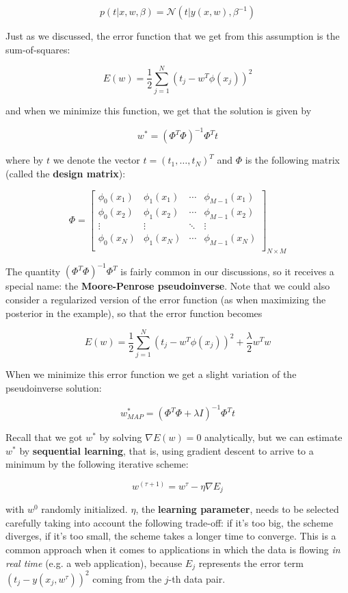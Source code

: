 \[p(t|x,w,\beta) = \mathcal{N}(t|y(x,w),\beta^{-1})\]

Just as we discussed, the error function that we get from this assumption is the sum-of-squares:

\[E(w) = \frac{1}{2}\sum_{j=1}^N(t_j - w^T\phi(x_j))^2\]

and when we minimize this function, we get that the solution is given by

\[w^* =  (\Phi^T\Phi)^{-1}\Phi^Tt\]

where by $t$ we denote the vector $t = (t_1,\dots, t_N)^T$ and $\Phi$ is the following matrix (called the \textbf{design matrix}):

\[\Phi = \begin{bmatrix}
	\phi_0(x_1)&\phi_1(x_1)&\cdots&\phi_{M-1}(x_1)\\
	\phi_0(x_2)&\phi_1(x_2)&\cdots&\phi_{M-1}(x_2)\\
	\vdots&\vdots&\ddots&\vdots\\
	\phi_0(x_N)&\phi_1(x_N)&\cdots&\phi_{M-1}(x_N)\\
\end{bmatrix}_{N\times M}\]

The quantity $(\Phi^T\Phi)^{-1}\Phi^T$ is fairly common in our discussions, so it receives a special name: the \textbf{Moore-Penrose pseudoinverse}. Note that we could also consider a regularized version of the error function (as when maximizing the posterior in the example), so that the error function becomes

\[E(w) = \frac{1}{2}\sum_{j=1}^N(t_j - w^T\phi(x_j))^2 + \frac{\lambda}{2}w^Tw\]

When we minimize this error function we get a slight variation of the pseudoinverse solution:

\[w^*_{MAP} = (\Phi^T\Phi + \lambda I)^{-1}\Phi^Tt\]

Recall that we got $w^*$ by solving $\nabla E(w) = 0$ analytically, but we can estimate $w^*$ by \textbf{sequential learning}, that is, using gradient descent to arrive to a minimum by the following iterative scheme:

\[w^{(\tau+1)} = w^\tau - \eta\nabla E_j\]

with $w^0$ randomly initialized. $\eta$, the \textbf{learning parameter}, needs to be selected carefully taking into account the following trade-off: if it's too big, the scheme diverges, if it's too small, the scheme takes a longer time to converge. This is a common approach when it comes to applications in which the data is flowing \textit{in real time} (e.g. a web application), because $E_j$ represents the error term $(t_j - y(x_j, w^{\tau}))^2$ coming from the $j$-th data pair.


